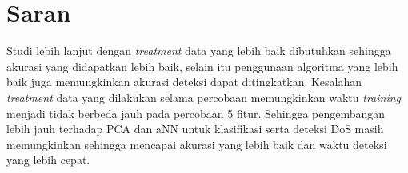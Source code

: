 \section{Saran}
Studi lebih lanjut dengan \textit{treatment} data yang lebih baik dibutuhkan sehingga akurasi yang didapatkan lebih baik, selain itu penggunaan algoritma yang lebih baik juga memungkinkan akurasi deteksi dapat ditingkatkan. Kesalahan \textit{treatment} data yang dilakukan selama percobaan memungkinkan waktu \textit{training} menjadi tidak berbeda jauh pada percobaan 5 fitur. Sehingga pengembangan lebih jauh terhadap PCA dan aNN untuk klasifikasi serta deteksi DoS masih memungkinkan sehingga mencapai akurasi yang lebih baik dan waktu deteksi yang lebih cepat.



